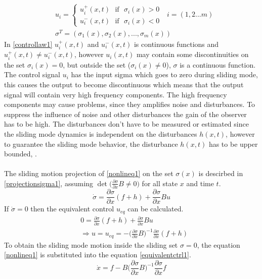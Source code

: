 \documentclass{LTHthesis}
\begin{document}
\begin{align} \label{controllaw1} \nonumber
& u_i = \begin{cases}
u_i^+(x,t) \ \ \ \mbox{if} \ \ \ \sigma_i(x)>0 \\
u_i^-(x,t) \ \ \ \mbox{if} \ \ \ \sigma_i(x)<0
\end{cases}
\ \ \ i=(1,2...m)
\\
& \sigma^T=(\sigma_1(x),\sigma_2(x),...,\sigma_m(x))
\end{align}
In \eqref{controllaw1} $u_i^+(x,t)$ and $u_i^-(x,t)$ is continuous functions and $u_i^+(x,t) \neq u_i^-(x,t)$, however $u_i(x,t)$ may contain some discontinuities on the set $\sigma_i(x)=0$, but outside the set ($\sigma_i(x) \neq 0$), $\sigma$ is a continuous function.
The control signal $u_i$ has the input sigma which goes to zero during sliding mode, this causes the output to become discontinuous which means that the output signal will contain very high frequency components. The high frequency components may cause problems, since they amplifies noise and disturbances.  To suppress the influence of noise and other disturbances the gain of the observer has to be high. The disturbances don't have to be measured or estimated since the sliding mode dynamics is independent on the disturbances $h(x,t)$, however to guarantee the sliding mode behavior, the disturbance $h(x,t)$ has to be upper bounded, \cite{chi2007}.\\ \\
The sliding motion projection of \eqref{nonlineq1} on the set $\sigma(x)$ is descirbed in \eqref{projectionsigma1}, assuming  $\det \big(\frac{\partial \sigma}{\partial x}B\neq 0\big)$ for all state $x$ and time $t$. 
\begin{equation} \label{projectionsigma1}
\dot{\sigma}= \frac{\partial \sigma}{\partial x}(f+h) + \frac{\partial \sigma}{\partial x}Bu
\end{equation}
If $\dot{\sigma}=0$ then the equivalent control $u_{eq}$ can be calculated.
\begin{align} \label{equivalentctrl1}
&0 = \frac{\partial \sigma}{\partial x}(f+h) + \frac{\partial \sigma}{\partial x}Bu \nonumber \\
&\Rightarrow u=u_{eq}=-\bigg(\frac{\partial \sigma}{\partial x}B\bigg)^{-1}\frac{\partial \sigma}{\partial x}(f+h)
\end{align}
To obtain the sliding mode motion inside the sliding set $\sigma=0$, the  equation \eqref{nonlineq1} is substituted into the equation \eqref{equivalentctrl1}. 
\begin{equation}\label{sm_analysis_eq1}
\dot{x}=f-B\bigg(\frac{\partial \sigma}{\partial x}B\bigg)^{-1}\frac{\partial \sigma}{\partial x}f
\end{equation}
\end{document}
